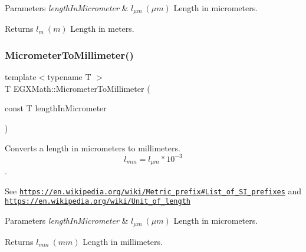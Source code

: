 \begin{DoxyParams}{Parameters}
{\em length\+In\+Micrometer} & $ l_{\mu m}\ (\mu m)$ Length in micrometers. \\
\hline
\end{DoxyParams}
\begin{DoxyReturn}{Returns}
$ l_{m}\ (m)$ Length in meters. 
\end{DoxyReturn}
\mbox{\label{group___e_g_x_math-_conversions-_length_conversions-_micrometer-_s_i_ga3c5ef053f2554257486e8633840d8ad6}} 
\subsubsection{\texorpdfstring{Micrometer\+To\+Millimeter()}{MicrometerToMillimeter()}}
{\footnotesize\ttfamily template$<$typename T $>$ \\
T E\+G\+X\+Math\+::\+Micrometer\+To\+Millimeter (\begin{DoxyParamCaption}\item[{const T}]{length\+In\+Micrometer }\end{DoxyParamCaption})}



Converts a length in micrometers to millimeters. \[ l_{mm}=l_{\mu m} * 10^{-3} \]. 

See \href{https://en.wikipedia.org/wiki/Metric_prefix#List_of_SI_prefixes}{\tt https\+://en.\+wikipedia.\+org/wiki/\+Metric\+\_\+prefix\#\+List\+\_\+of\+\_\+\+S\+I\+\_\+prefixes} and \href{https://en.wikipedia.org/wiki/Unit_of_length}{\tt https\+://en.\+wikipedia.\+org/wiki/\+Unit\+\_\+of\+\_\+length} 
\begin{DoxyParams}{Parameters}
{\em length\+In\+Micrometer} & $ l_{\mu m}\ (\mu m)$ Length in micrometers. \\
\hline
\end{DoxyParams}
\begin{DoxyReturn}{Returns}
$ l_{mm}\ (mm)$ Length in millimeters. 
\end{DoxyReturn}
\mbox{\label{group___e_g_x_math-_conversions-_length_conversions-_micrometer-_s_i_gaf8c9401ae0ce0536229d6c24894d30bc}} 
